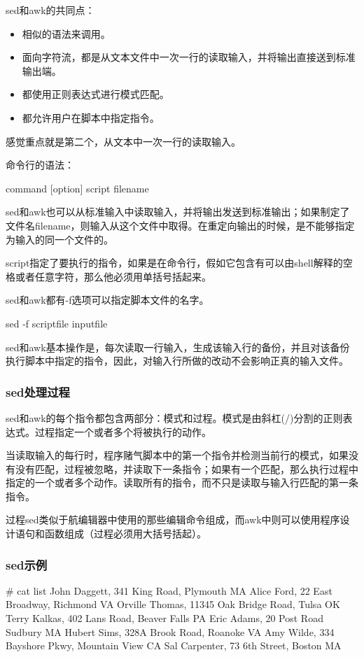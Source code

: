 sed和awk的共同点：
\begin{itemize}
\item 相似的语法来调用。
\item 面向字符流，都是从文本文件中一次一行的读取输入，并将输出直接送到标准输出端。
\item 都使用正则表达式进行模式匹配。
\item 都允许用户在脚本中指定指令。
\end{itemize}

感觉重点就是第二个，从文本中一次一行的读取输入。


命令行的语法：
\begin{Command-Line}
command [option] script filename
\end{Command-Line}

sed和awk也可以从标准输入中读取输入，并将输出发送到标准输出；如果制定了文件名filename，则输入从这个文件中取得。在重定向输出的时候，是不能够指定为输入的同一个文件的。

script指定了要执行的指令，如果是在命令行，假如它包含有可以由shell解释的空格或者任意字符，那么他必须用单括号括起来。

sed和awk都有-f选项可以指定脚本文件的名字。

\begin{Command-Line}
sed -f scriptfile inputfile
\end{Command-Line}

sed和awk基本操作是，每次读取一行输入，生成该输入行的备份，并且对该备份执行脚本中指定的指令，因此，对输入行所做的改动不会影响正真的输入文件。


\subsubsection{sed处理过程}
sed和awk的每个指令都包含两部分：模式和过程。模式是由斜杠(/)分割的正则表达式。过程指定一个或者多个将被执行的动作。

当读取输入的每行时，程序赌气脚本中的第一个指令并检测当前行的模式，如果没有没有匹配，过程被忽略，并读取下一条指令；如果有一个匹配，那么执行过程中指定的一个或者多个动作。读取所有的指令，而不只是读取与输入行匹配的第一条指令。

过程sed类似于航编辑器中使用的那些编辑命令组成，而awk中则可以使用程序设计语句和函数组成（过程必须用大括号括起）。


\subsubsection{sed示例}
\begin{Command-Line}# cat list
John Daggett, 341 King Road, Plymouth MA
Alice Ford, 22 East Broadway, Richmond VA
Orville Thomas, 11345 Oak Bridge Road, Tulsa OK
Terry Kalkas, 402 Lans Road, Beaver Falls PA
Eric Adams, 20 Post Road Sudbury MA
Hubert Sims, 328A Brook Road, Roanoke VA
Amy Wilde, 334 Bayshore Pkwy, Mountain View CA
Sal Carpenter, 73 6th Street, Boston MA
\end{Command-Line}

